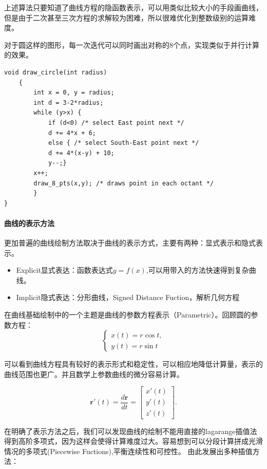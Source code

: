 上述算法只要知道了曲线方程的隐函数表示，可以用类似比较大小的手段画曲线，但是由于二次甚至三次方程的求解较为困难，所以很难优化到整数级别的运算难度。

对于圆这样的图形，每一次迭代可以同时画出对称的8个点，实现类似于并行计算的效果。

\begin{lstlisting}[style=MyCppStyle]
    void draw_circle(int radius) 
    {
        int x = 0, y = radius;
        int d = 3-2*radius;
        while (y>x) {
            if (d<0) /* select East point next */
            d += 4*x + 6;
            else { /* select South-East point next */
            d += 4*(x-y) + 10;
            y--;}
        x++;
        draw_8_pts(x,y); /* draws point in each octant */
        }
}
\end{lstlisting}

\paragraph{曲线的表示方法}

更加普遍的曲线绘制方法取决于曲线的表示方式，主要有两种：显式表示和隐式表示。

\begin{itemize}
    \item Explicit显式表达：函数表达式$y= f(x)$,可以用带入的方法快速得到复杂曲线。
    \item Implicit隐式表达：分形曲线，Signed Distance Fuction，解析几何方程
\end{itemize}

在曲线基础绘制中的一个主题是曲线的参数方程表示（Parametric）。回顾圆的参数方程：
\[
\begin{cases}
    x(t) = r \cos t,\\
    y(t) = r \sin t
\end{cases}
\]

可以看到曲线方程具有较好的表示形式和稳定性，可以相应地降低计算量，表示的曲线范围也更广。并且数学上参数曲线的微分容易计算。

\[
\mathbf r'(t)
=
\frac{d\mathbf r}{dt}
=
\begin{bmatrix}
x'(t)\\
y'(t)\\
z'(t)
\end{bmatrix}.
\]

在明确了表示方法之后，我们可以发现曲线的绘制不能用直接的lagarange插值法得到高阶多项式，因为这样会使得计算难度过大。容易想到可以分段计算拼成光滑情况的多项式(Piecewise Fuctions),平衡连续性和可控性。
由此发展出多种插值方法：

